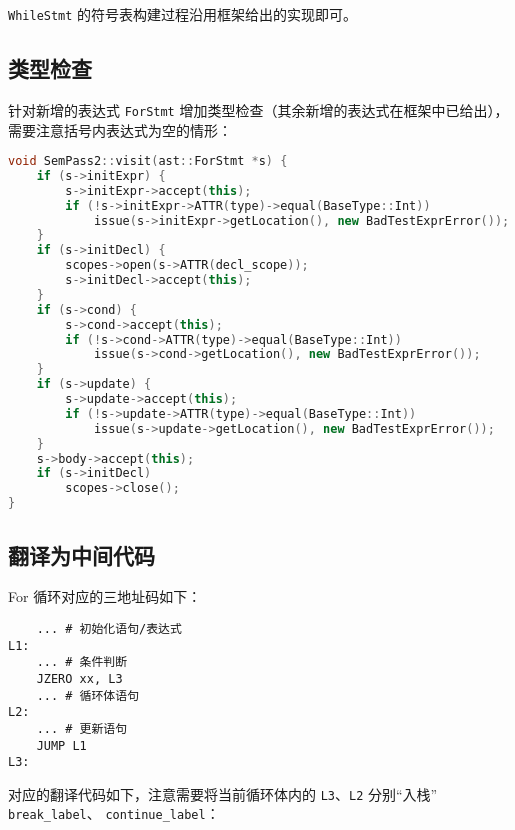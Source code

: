 \documentclass[a4paper]{article}
\begin{document}
\texttt{WhileStmt} 的符号表构建过程沿用框架给出的实现即可。

\subsection{类型检查}

针对新增的表达式 \texttt{ForStmt} 增加类型检查（其余新增的表达式在框架中已给出），需要注意括号内表达式为空的情形：

\begin{lstlisting}[language=c++]
void SemPass2::visit(ast::ForStmt *s) {
    if (s->initExpr) {
        s->initExpr->accept(this);
        if (!s->initExpr->ATTR(type)->equal(BaseType::Int))
            issue(s->initExpr->getLocation(), new BadTestExprError());
    }
    if (s->initDecl) {
        scopes->open(s->ATTR(decl_scope));
        s->initDecl->accept(this);
    }
    if (s->cond) {
        s->cond->accept(this);
        if (!s->cond->ATTR(type)->equal(BaseType::Int))
            issue(s->cond->getLocation(), new BadTestExprError());
    }
    if (s->update) {
        s->update->accept(this);
        if (!s->update->ATTR(type)->equal(BaseType::Int))
            issue(s->update->getLocation(), new BadTestExprError());
    }
    s->body->accept(this);
    if (s->initDecl)
        scopes->close();
}
\end{lstlisting}

\subsection{翻译为中间代码}

For 循环对应的三地址码如下：

\begin{lstlisting}
    ... # 初始化语句/表达式
L1:
    ... # 条件判断
    JZERO xx, L3
    ... # 循环体语句
L2:
    ... # 更新语句
    JUMP L1
L3:
\end{lstlisting}

对应的翻译代码如下，注意需要将当前循环体内的 \texttt{L3}、\texttt{L2} 分别“入栈” \texttt{break\_label}、 \texttt{continue\_label}：
\end{document}
